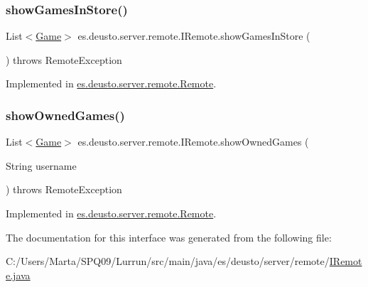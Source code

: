 \mbox{\label{interfacees_1_1deusto_1_1server_1_1remote_1_1_i_remote_a091249da31b567c1be29e07085d3ff18}} 
\subsubsection{\texorpdfstring{show\+Games\+In\+Store()}{showGamesInStore()}}
{\footnotesize\ttfamily List$<$\hyperlink{classes_1_1deusto_1_1server_1_1db_1_1data_1_1_game}{Game}$>$ es.\+deusto.\+server.\+remote.\+I\+Remote.\+show\+Games\+In\+Store (\begin{DoxyParamCaption}{ }\end{DoxyParamCaption}) throws Remote\+Exception}



Implemented in \hyperlink{classes_1_1deusto_1_1server_1_1remote_1_1_remote_ae40a5882d6b3ef3d5928d87dafeb15fa}{es.\+deusto.\+server.\+remote.\+Remote}.

\mbox{\label{interfacees_1_1deusto_1_1server_1_1remote_1_1_i_remote_aaaf6af5906c81cbd7b3b190a70ead98b}} 
\subsubsection{\texorpdfstring{show\+Owned\+Games()}{showOwnedGames()}}
{\footnotesize\ttfamily List$<$\hyperlink{classes_1_1deusto_1_1server_1_1db_1_1data_1_1_game}{Game}$>$ es.\+deusto.\+server.\+remote.\+I\+Remote.\+show\+Owned\+Games (\begin{DoxyParamCaption}\item[{String}]{username }\end{DoxyParamCaption}) throws Remote\+Exception}



Implemented in \hyperlink{classes_1_1deusto_1_1server_1_1remote_1_1_remote_a73569877f9317fc48a4e134977baa304}{es.\+deusto.\+server.\+remote.\+Remote}.



The documentation for this interface was generated from the following file\+:\begin{DoxyCompactItemize}
\item 
C\+:/\+Users/\+Marta/\+S\+P\+Q09/\+Lurrun/src/main/java/es/deusto/server/remote/\hyperlink{_i_remote_8java}{I\+Remote.\+java}\end{DoxyCompactItemize}
